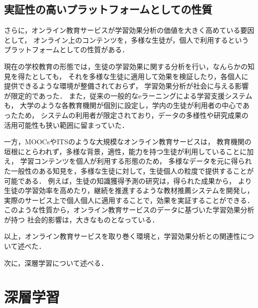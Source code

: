\subsection{実証性の高いプラットフォームとしての性質}

さらに，オンライン教育サービスが学習効果分析の価値を大きく高めている要因として，
オンライン上のコンテンツを，多様な生徒が，個人で利用するというプラットフォームとしての性質がある．

現在の学校教育の形態では，生徒の学習効果に関する分析を行い，なんらかの知見を得たとしても，
それを多様な生徒に適用して効果を検証したり，各個人に提供できるような環境が整備されておらず，
学習効果分析が社会に与える影響が限定的であった．
また，従来の一般的なeラーニングによる学習支援システムも，
大学のような各教育機関が個別に設定し，学内の生徒が利用者の中心であったため，
システムの利用者が限定されており，データの多様性や研究成果の活用可能性も狭い範囲に留まっていた．


一方，MOOCsやITSのような大規模なオンライン教育サービスは，
教育機関の垣根にとらわれず，多様な背景，適性，能力を持つ生徒が利用していることに加え，
学習コンテンツを個人が利用する形態のため，
多様なデータを元に得られた一般性のある知見を，多様な生徒に対して，生徒個人の粒度で提供することが可能である．
例えば，生徒の知識獲得予測の研究は，得られた成果から，
より生徒の学習効率を高めたり，継続を推進するような教材推薦システムを開発し，
実際のサービス上で個人個人に適用することで，効果を実証することができる．
このような性質から，オンライン教育サービスのデータに基づいた学習効果分析が持つ
社会的影響は，大きなものとなっている．

\vvspace

以上，オンライン教育サービスを取り巻く環境と，学習効果分析との関連性について述べた．

次に，深層学習について述べる．




\section{深層学習}

